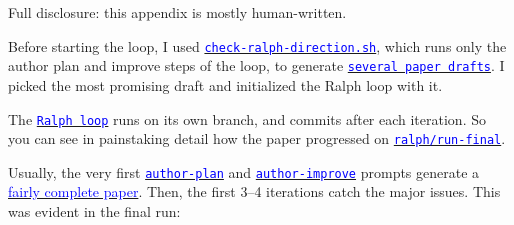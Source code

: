 \documentclass[12pt]{article}
\begin{document}
Full disclosure: this appendix is mostly human-written.

Before starting the loop, I used \href{https://github.com/redacted/ralph-wiggum-asset-pricing/blob/main/check-ralph-direction.sh}{\textcolor{blue}{\texttt{check-ralph-direction.sh}}}, which runs only the author plan and improve steps of the loop, to generate \href{https://github.com/redacted/ralph-wiggum-asset-pricing/tree/human-preface/ralph-garage/check-direction}{\textcolor{blue}{\texttt{several paper drafts}}}. I picked the most promising draft and initialized the Ralph loop with it.

The \href{https://github.com/redacted/ralph-wiggum-asset-pricing/blob/main/ralph/ralph-loop.sh}{\textcolor{blue}{\texttt{Ralph loop}}} runs on its own branch, and commits after each iteration. So you can see in painstaking detail how the paper progressed on \href{https://github.com/redacted/ralph-wiggum-asset-pricing/commits/ralph/run-final/}{\textcolor{blue}{\texttt{ralph/run-final}}}.

Usually, the very first \href{https://github.com/redacted/ralph-wiggum-asset-pricing/blob/main/ralph/author-plan.py}{\textcolor{blue}{\texttt{author-plan}}} and \href{https://github.com/redacted/ralph-wiggum-asset-pricing/blob/main/ralph/author-improve.py}{\textcolor{blue}{\texttt{author-improve}}} prompts generate a \href{https://github.com/redacted/ralph-wiggum-asset-pricing/blob/final-pass/ralph-garage/history/001-paper.pdf}{\textcolor{blue}{fairly complete paper}}. Then, the first 3--4 iterations catch the major issues. This was evident in the final run:
\end{document}
